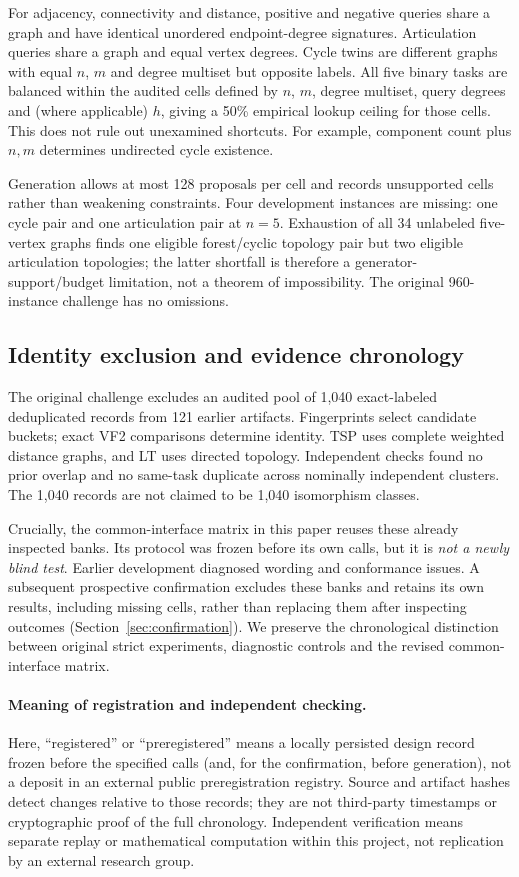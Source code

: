 For adjacency, connectivity and distance, positive and negative queries
share a graph and have identical unordered endpoint-degree signatures.
Articulation queries share a graph and equal vertex degrees. Cycle twins
are different graphs with equal $n$, $m$ and degree multiset but opposite
labels. All five binary tasks are balanced within the audited cells defined by
$n$, $m$, degree multiset, query degrees and (where applicable) $h$, giving a 50\% empirical
lookup ceiling for those cells. This does not rule out unexamined shortcuts.
For example, component count plus $n,m$ determines undirected cycle existence.

Generation allows at most 128 proposals per cell and records unsupported
cells rather than weakening constraints. Four development instances are
missing: one cycle pair and one articulation pair at $n=5$.
Exhaustion of all 34 unlabeled five-vertex graphs finds one eligible
forest/cyclic topology pair but two eligible articulation topologies; the
latter shortfall is therefore a generator-support/budget limitation, not
a theorem of impossibility. The original 960-instance challenge has no omissions.

\subsection{Identity exclusion and evidence chronology}
The original challenge excludes an audited pool of 1,040 exact-labeled
deduplicated records from 121 earlier artifacts. Fingerprints select candidate
buckets; exact VF2 comparisons determine identity. TSP uses complete weighted
distance graphs, and LT uses directed topology. Independent checks found no
prior overlap and no same-task duplicate across nominally independent
clusters. The 1,040 records are not claimed to be 1,040 isomorphism classes.

Crucially, the common-interface matrix in this paper reuses these already
inspected banks. Its protocol was frozen before its own calls, but it is
\emph{not a newly blind test}. Earlier development diagnosed wording and
conformance issues. A subsequent prospective confirmation excludes these
banks and retains its own results, including missing cells, rather than replacing
them after inspecting outcomes (Section~\ref{sec:confirmation}).
We preserve the chronological distinction
between original strict experiments, diagnostic controls and the revised
common-interface matrix.

\paragraph{Meaning of registration and independent checking.}
Here, ``registered'' or ``preregistered'' means a locally persisted design
record frozen before the specified calls (and, for the confirmation, before
generation), not a deposit in an external public preregistration registry.
Source and artifact hashes detect changes relative to those records; they
are not third-party timestamps or cryptographic proof of the full chronology.
Independent verification means separate replay or mathematical computation
within this project, not replication by an external research group.


